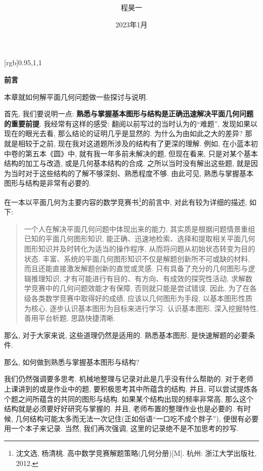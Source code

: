 \documentclass{book}
\title{\textbf{\heiti{几何专题}}}
\author{\kaishu 程昊一}
\date{2023年1月}
\begin{document}
[rgb]{0.95,1,1}
\maketitle\newpage
\thispagestyle{plain}

\vspace*{2.25cm}
{\raggedright\Huge\bfseries{前言}}
\vspace*{1cm}\par 
本章就如何解平面几何问题做一些探讨与说明.\par
首先, 我们要说明一点: \textbf{熟悉与掌握基本图形与结构是正确迅速解决平面几何问题的重要前提}. 我经常有这样的感受: 翻阅以前写过的当时认为的“难题”, 发现如果以现在的眼光去看, 那么结论的证明几乎是显然的. 为什么为由如此之大的差异? 那就是相较于之前, 现在我对这道题所涉及的结构有了更深的理解. 例如, 在小蓝本初中卷的第五本《圆》中, 就有我一年多前未解决的题, 但现在看来, 只是对某个基本结构的加工与改造, 或是几何基本结构的合成. 之所以当时没有解出这些题, 就是因为当时对于这些结构的了解不够深刻、熟悉程度不够. 由此可见, 熟悉与掌握基本图形与结构是非常有必要的.\par
在一本以平面几何为主要内容的数学竞赛书\footnote{沈文选, 杨清桃. 高中数学竞赛解题策略(几何分册)[M]. 杭州: 浙江大学出版社, 2012.}的前言中, 对此有较为详细的描述, 如下:
\begin{quote}
	\kaishu \hspace{2em}一个人在解决平面几何问题中体现出来的能力, 其实质是根据问题情景重组已知的平面几何图形知识, 能正确、迅速地检索、选择和提取相关平面几何图形知识并及时转化为适当的操作程序, 从而将问题从初始状态转变为目的状态. 丰富、系统的平面几何图形知识不仅是解题创新所不可或缺的材料, 而且还能直接激发解题创新的直觉或灵感. 只有具备了充分的几何图形与逻辑推理知识, 才有可能进行有目的、有方向、有成效的探究性活动, 求解数学竞赛中的几何问题效能才有保障, 否则就只能是尝试错误. 因此, 为了在各级各类数学竞赛中取得好的成绩, 应该以几何图形为手段, 以基本图形性质为核心, 逐步认识基本图形为目标来进行学习. 认识基本图形, 深入挖掘特性, 善用平台析题, 思路快捷清晰. 
\end{quote}\par
那么, 对于大家来说, 这些道理仍然是适用的. 熟悉基本图形, 是快速解题的必要条件.\par
那么, 如何做到熟悉与掌握基本图形与结构?\par
我们仍然强调要多思考. 机械地整理与记录对此是几乎没有什么帮助的. 对于老师上课讲到的或是作业中的题, 要积极思考其中所蕴含的结构. 并且, 可以尝试提炼各个题之间所蕴含的共同的图形与结构. 如果某个结构出现的频率非常高, 那么这个结构就是必须要好好研究与掌握的. 并且, 老师布置的整理作业也是必要的. 有时候, 几何结构可能太多而无法一次记住(正如俗语“一口吃不成个胖子”), 便很有必要用一个本子来记录. 当然, 我们再次强调, 这里的记录绝不是不加思考的抄写.\par 
\end{document}
